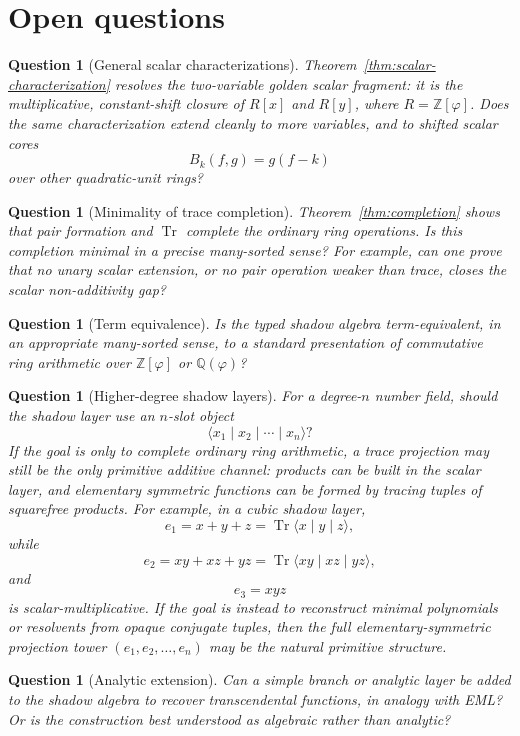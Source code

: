 \documentclass[11pt]{article}
\newtheorem{question}[definition]{Question}
\newcommand{\Tr}{\operatorname{Tr}}
\newcommand{\ph}{\varphi}
\newcommand{\Q}{\mathbb{Q}}
\newcommand{\Z}{\mathbb{Z}}
\begin{document}
\section{Open questions}

\begin{question}[General scalar characterizations]
Theorem~\ref{thm:scalar-characterization} resolves the two-variable golden scalar fragment: it is the multiplicative, constant-shift closure of $R[x]$ and $R[y]$, where $R=\Z[\ph]$.  Does the same characterization extend cleanly to more variables, and to shifted scalar cores
\[
    B_k(f,g)=g(f-k)
\]
over other quadratic-unit rings?
\end{question}

\begin{question}[Minimality of trace completion]
Theorem~\ref{thm:completion} shows that pair formation and $\Tr$ complete the ordinary ring operations.  Is this completion minimal in a precise many-sorted sense?  For example, can one prove that no unary scalar extension, or no pair operation weaker than trace, closes the scalar non-additivity gap?
\end{question}

\begin{question}[Term equivalence]
Is the typed shadow algebra term-equivalent, in an appropriate many-sorted sense, to a standard presentation of commutative ring arithmetic over $\Z[\ph]$ or $\Q(\ph)$?
\end{question}

\begin{question}[Higher-degree shadow layers]
For a degree-$n$ number field, should the shadow layer use an $n$-slot object
\[
    \langle x_1\mid x_2\mid\cdots\mid x_n\rangle?
\]
If the goal is only to complete ordinary ring arithmetic, a trace projection may still be the only primitive additive channel: products can be built in the scalar layer, and elementary symmetric functions can be formed by tracing tuples of squarefree products.  For example, in a cubic shadow layer,
\[
    e_1=x+y+z=\Tr\langle x\mid y\mid z\rangle,
\]
while
\[
    e_2=xy+xz+yz=\Tr\langle xy\mid xz\mid yz\rangle,
\]
and
\[
    e_3=xyz
\]
is scalar-multiplicative.  If the goal is instead to reconstruct minimal polynomials or resolvents from opaque conjugate tuples, then the full elementary-symmetric projection tower $(e_1,e_2,\dots,e_n)$ may be the natural primitive structure.
\end{question}

\begin{question}[Analytic extension]
Can a simple branch or analytic layer be added to the shadow algebra to recover transcendental functions, in analogy with EML?  Or is the construction best understood as algebraic rather than analytic?
\end{question}
\end{document}
